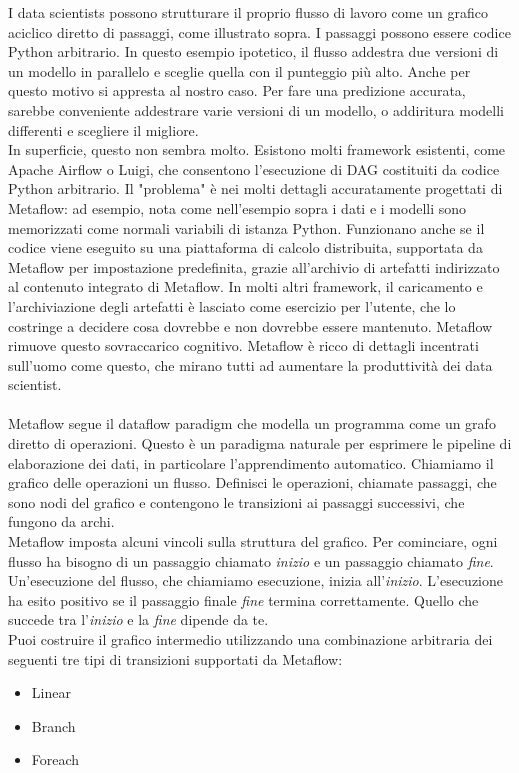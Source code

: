 \documentclass[12pt,a4paper]{report}
\begin{document}
I data scientists possono strutturare il proprio flusso di lavoro come un grafico aciclico diretto di passaggi, come illustrato sopra. I passaggi possono essere codice Python arbitrario. In questo esempio ipotetico, il flusso addestra due versioni di un modello in parallelo e sceglie quella con il punteggio più alto. Anche per questo motivo si appresta al nostro caso. Per fare una predizione accurata, sarebbe conveniente addestrare varie versioni di un modello, o addiritura modelli differenti e scegliere il migliore.\\
In superficie, questo non sembra molto. Esistono molti framework esistenti, come Apache Airflow o Luigi, che consentono l'esecuzione di DAG costituiti da codice Python arbitrario. Il "problema" è nei molti dettagli accuratamente progettati di Metaflow: ad esempio, nota come nell'esempio sopra i dati e i modelli sono memorizzati come normali variabili di istanza Python. Funzionano anche se il codice viene eseguito su una piattaforma di calcolo distribuita, supportata da Metaflow per impostazione predefinita, grazie all'archivio di artefatti indirizzato al contenuto integrato di Metaflow. In molti altri framework, il caricamento e l'archiviazione degli artefatti è lasciato come esercizio per l'utente, che lo costringe a decidere cosa dovrebbe e non dovrebbe essere mantenuto. Metaflow rimuove questo sovraccarico cognitivo.
Metaflow è ricco di dettagli incentrati sull'uomo come questo, che mirano tutti ad aumentare la produttività dei data scientist.\\
\\
Metaflow segue il dataflow paradigm che modella un programma come un grafo diretto di operazioni. Questo è un paradigma naturale per esprimere le pipeline di elaborazione dei dati, in particolare l'apprendimento automatico.
Chiamiamo il grafico delle operazioni un flusso. Definisci le operazioni, chiamate passaggi, che sono nodi del grafico e contengono le transizioni ai passaggi successivi, che fungono da archi.\\
Metaflow imposta alcuni vincoli sulla struttura del grafico. Per cominciare, ogni flusso ha bisogno di un passaggio chiamato \emph{inizio} e un passaggio chiamato \emph{fine}. Un'esecuzione del flusso, che chiamiamo esecuzione, inizia all'\emph{inizio}. L'esecuzione ha esito positivo se il passaggio finale \emph{fine} termina correttamente.
Quello che succede tra l'\emph{inizio} e la \emph{fine} dipende da te.\\
Puoi costruire il grafico intermedio utilizzando una combinazione arbitraria dei seguenti tre tipi di transizioni supportati da Metaflow:
\begin{itemize}
    \item Linear 
    \item Branch
    \item Foreach
\end{itemize}
\end{document}
